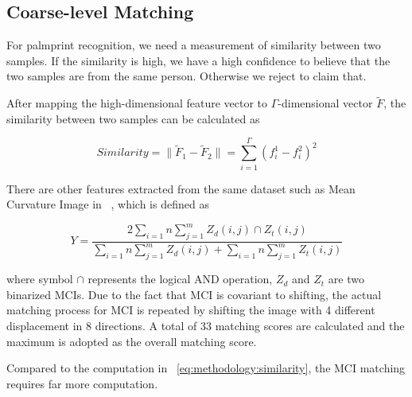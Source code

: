 \subsection{Coarse-level Matching}
\label{ssec:methodology:naive}

For palmprint recognition, we need a measurement of similarity between two samples. If the similarity is high, we have a high confidence to believe that the two samples are from the same person. Otherwise we reject to claim that.

After mapping the high-dimensional feature vector to $\Gamma$-dimensional vector $\tilde{F}$, the similarity between two samples can be calculated as

\begin{equation}
Similarity= \| \tilde{F}_1 -\tilde{F}_2 \|
= \sum \limits_{i=1}^{\Gamma} (f_i^1-f_i^2)^2
\label{eq:methodology:similarity}
\end{equation}

There are other features extracted from the same dataset such as Mean Curvature Image in ~\cite{Zhang:2009dp}, which is defined as

\begin{equation}
Y=\frac{
    2\sum \limits_{i=1}{n} \sum \limits_{j=1}^{m} Z_d(i,j) \cap Z_t(i,j)
}
{
    \sum \limits_{i=1}{n} \sum \limits_{j=1}^{m} Z_d(i,j) +
    \sum \limits_{i=1}{n} \sum \limits_{j=1}^{m} Z_t(i,j)
}
\end{equation}

where symbol $\cap$ represents the logical AND operation, $Z_d$ and $Z_t$ are two binarized MCIs. Due to the fact that MCI is covariant to shifting, the actual matching process for MCI is repeated by shifting the image with 4 different displacement in 8 directions. A total of 33 matching scores are calculated and the maximum is adopted as the overall matching score.

Compared to the computation in ~\ref{eq:methodology:similarity}, the MCI matching requires far more computation.